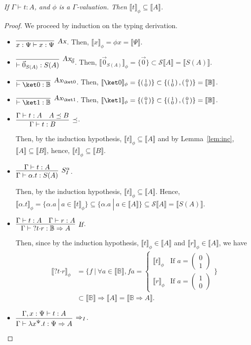 \documentclass[preprint]{elsarticle}
\newcommand\recap[3]{\noindent {\bf #1 \ref{#2}.} \emph{#3}}
\newcommand\B{\ensuremath{\mathbb B}}
\newcommand\gB{\ensuremath{\Psi}}
\newcommand\ite[3]{{#1}?{#2}\mathord{\cdot}{#3}}
\newcommand\z[1][A]{\vec 0_{S(#1)}}
\newcommand\tax{\textsl{Ax}}
\newcommand\tif{\textsl{If}}
\newcommand\gen{\mathcal S} \newcommand\den[1]{\llbracket #1 \rrbracket}
\newcommand\vect[2]{\left(\begin{smallmatrix} #1 \\ #2\end{smallmatrix}\right)}
\begin{document}
\recap{Theorem}{thm:soundness}{
  If $\Gamma\vdash t:A$, and $\phi$ is a $\Gamma$-valuation. Then $\den
  t_\phi\subseteq\den A$.
}
\begin{proof}
  We proceed by induction on the typing derivation.
  \begin{itemize}
  \item $\vcenter{\infer[\tax]{x:\gB\vdash x:\gB}{}}$.
    Then, $\den x_\phi=\phi x=\den{\gB}$.
  \item $\vcenter{\infer[\tax_{\vec 0}]{{\vdash \z:S(A)}}{}}$.
    Then, $\den{\z}_\phi = \{\vec 0\}\subset\gen\den A=\den{S(A)}$.
  \item $\vcenter{\infer[\tax_{\ket 0}]{{\vdash\ket 0:\B}}{}}$.
    Then, $\den{\ket 0}_\phi=\{\vect 10\}\subset\{\vect 10,\vect 01\}=\den{\B}$.
  \item $\vcenter{\infer[\tax_{\ket 1}]{{\vdash\ket 1:\B}}{}}$.
    Then, $\den{\ket 1}_\phi=\{\vect 01\}\subset\{\vect 10,\vect 01\}=\den{\B}$.
  \item $\vcenter{\infer[\preceq]{{\Gamma\vdash t:B}}{\Gamma\vdash t:A &
        A\preceq B}}$.

    Then, by the induction hypothesis, $\den t_\phi\subseteq\den A$ and by
    Lemma~\ref{lem:inc}, $\den A\subseteq\den B$, hence, $\den
    t_\phi\subseteq\den B$.
  \item $\vcenter{\infer[S_I^\alpha]{{\Gamma\vdash \alpha.t:S(A)}}{{\Gamma\vdash t:A}}}$.

    Then, by the induction hypothesis, $\den t_\phi\subseteq\den A$.
    Hence, $\den{\alpha.t}_\phi=\{\alpha.a~|~a\in\den
    t_\phi\}\subseteq\{\alpha.a~|~a\in\den A\}\subseteq\gen\den A=\den{S(A)}$.
  \item $\vcenter{\infer[\tif]{\Gamma\vdash\ite{}tr:\B\Rightarrow A}{\Gamma\vdash t:A
        & \Gamma\vdash r:A}}$.

    Then, since by the induction hypothesis, $\den t_\phi\in\den A$ and $\den
    r_\phi\in\den A$, we have
    \begin{align*}
      \den{\ite{}tr}_\phi & =\{f~|~\forall a\in\den{\B}, fa=\left\{\begin{array}{ll}
                                                                     \den t_\phi & \textrm{If }a=\vect 01\\
                                                                     \den r_\phi & \textrm{If }a=\vect 10
                                                                   \end{array}\right.\}\\
                          &\subset\den{\B}\Rightarrow\den{A}=\den{\B\Rightarrow A}.
    \end{align*}
  \item $\vcenter{\infer[\Rightarrow_I]{{\Gamma\vdash\lambda x^{\gB}.t:\gB\Rightarrow A}}{{\Gamma,x:\gB\vdash t:A}}}$.


\end{itemize}
\end{proof}
\end{document}
